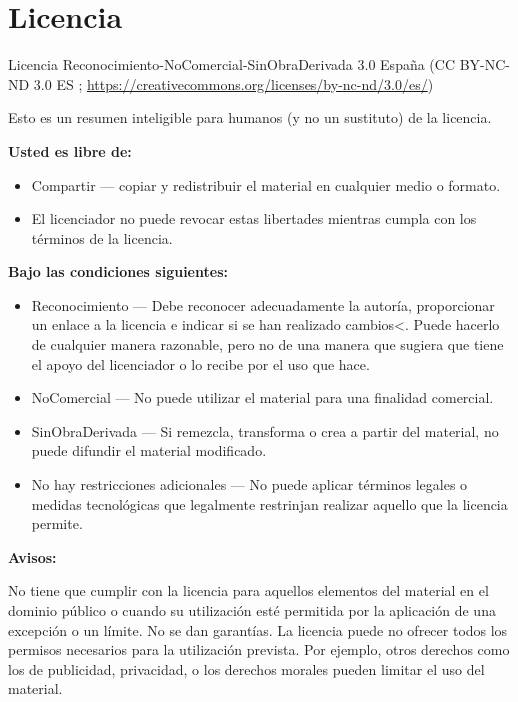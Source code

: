 \documentclass[]{book}
\providecommand{\tightlist}{%
  \setlength{\itemsep}{0pt}\setlength{\parskip}{0pt}}
\begin{document}
\chapter{Licencia}\label{licence}

Licencia Reconocimiento-NoComercial-SinObraDerivada 3.0 España (CC
BY-NC-ND 3.0 ES ;
\url{https://creativecommons.org/licenses/by-nc-nd/3.0/es/})

Esto es un resumen inteligible para humanos (y no un sustituto) de la
licencia.

\textbf{Usted es libre de:}

\begin{itemize}
\tightlist
\item
  Compartir --- copiar y redistribuir el material en cualquier medio o
  formato.
\item
  El licenciador no puede revocar estas libertades mientras cumpla con
  los términos de la licencia.
\end{itemize}

\textbf{Bajo las condiciones siguientes:}

\begin{itemize}
\item
  Reconocimiento --- Debe reconocer adecuadamente la autoría,
  proporcionar un enlace a la licencia e indicar si se han realizado
  cambios\textless{}. Puede hacerlo de cualquier manera razonable, pero
  no de una manera que sugiera que tiene el apoyo del licenciador o lo
  recibe por el uso que hace.
\item
  NoComercial --- No puede utilizar el material para una finalidad
  comercial.
\item
  SinObraDerivada --- Si remezcla, transforma o crea a partir del
  material, no puede difundir el material modificado.
\item
  No hay restricciones adicionales --- No puede aplicar términos legales
  o medidas tecnológicas que legalmente restrinjan realizar aquello que
  la licencia permite.
\end{itemize}

\textbf{Avisos: }

No tiene que cumplir con la licencia para aquellos elementos del
material en el dominio público o cuando su utilización esté permitida
por la aplicación de una excepción o un límite. No se dan garantías. La
licencia puede no ofrecer todos los permisos necesarios para la
utilización prevista. Por ejemplo, otros derechos como los de
publicidad, privacidad, o los derechos morales pueden limitar el uso del
material.
\end{document}
